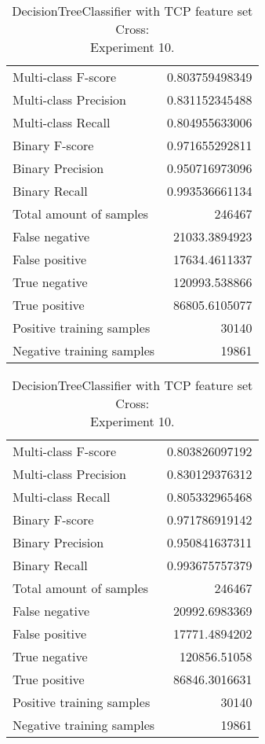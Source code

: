 \begin{table}[H]
\begin{minipage}{0.5\textwidth}
\caption{DecisionTreeClassifier with TCP feature set Cross: \\Experiment 9.}
\centering
\begin{tabular}{l r}
\toprule
Multi-class F-score & 0.803759498349 \\
Multi-class Precision & 0.831152345488 \\
Multi-class Recall & 0.804955633006 \\
\midrule
Binary F-score & 0.971655292811 \\
Binary Precision & 0.950716973096 \\
Binary Recall & 0.993536661134 \\
\midrule
Total amount of samples & 246467 \\
False negative & 21033.3894923 \\
False positive & 17634.4611337 \\
True negative & 120993.538866 \\
True positive & 86805.6105077 \\
\midrule
Positive training samples & 30140 \\
Negative training samples & 19861 \\
\bottomrule
\end{tabular}
\end{minipage}
\hfillx
\begin{minipage}{0.5\textwidth}
\caption{DecisionTreeClassifier with TCP feature set Cross: \\Experiment 10.}
\label{}
\centering
\begin{tabular}{l r}
\toprule
Multi-class F-score & 0.803826097192 \\
Multi-class Precision & 0.830129376312 \\
Multi-class Recall & 0.805332965468 \\
\midrule
Binary F-score & 0.971786919142 \\
Binary Precision & 0.950841637311 \\
Binary Recall & 0.993675757379 \\
\midrule
Total amount of samples & 246467 \\
False negative & 20992.6983369 \\
False positive & 17771.4894202 \\
True negative & 120856.51058 \\
True positive & 86846.3016631 \\
\midrule
Positive training samples & 30140 \\
Negative training samples & 19861 \\
\bottomrule
\end{tabular}
\end{minipage}
\end{table}

